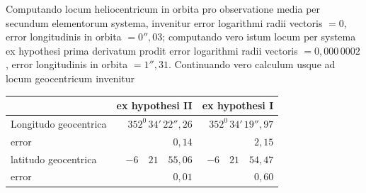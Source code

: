 Computando locum heliocentricum in orbita pro observatione media per secundum elementorum systema, invenitur error logarithmi radii vectoris $=0$, error longitudinis in orbita $=0''{,}03$; computando vero istum locum per systema ex hypothesi prima derivatum prodit error logarithmi radii vectoris $=0{,}000\,0002$, error longitudinis in orbita $=1''{,}31$. Continuando vero calculum usque ad locum geocentricum invenitur
\begin{center}
\begingroup\small\setlength{\tabcolsep}{4pt}\renewcommand{\arraystretch}{1.2}
\begin{tabular}{|l|r|r|}\hline
& ex hypothesi II & ex hypothesi I\\\hline
Longitudo geocentrica & $352^{0}\,34'\,22''{,}26$ & $352^{0}\,34'\,19''{,}97$\\
error & $0{,}14$ & $2{,}15$\\
latitudo geocentrica & $-6\quad21\quad55{,}06$ & $-6\quad21\quad54{,}47$\\
error & $0{,}01$ & $0{,}60$\\\hline
\end{tabular}\endgroup
\end{center}
